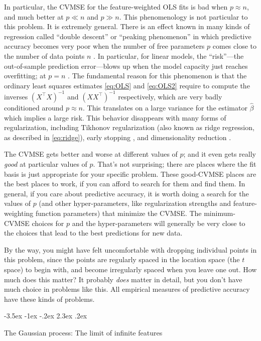 \documentclass[12pt,letterpaper]{article}
\makeatletter
\renewcommand\section{\@startsection {section}{1}{\z@}%
  {-3.5ex \@plus -1ex \@minus -.2ex}%
  {2.3ex \@plus.2ex}%
  {\raggedright\normalfont\Large\bfseries}}
\makeatother
\begin{document}
In particular, the CVMSE for the feature-weighted OLS fits is bad when $p\approx n$, and much better at $p\ll n$ and $p \gg n$.
This phenomenology is not particular to this problem.
It is extremely general.
There is an effect known in many kinds of regression called ``double descent'' or ``peaking phenomenon'' in which predictive accuracy becomes very poor when the number of free parameters $p$ comes close to the number of data points $n$ \cite{jain198239, spigler2018jamming, geiger2019jamming}. In particular, for linear models, the ``risk''---the out-of-sample prediction error---blows up when the model capacity just reaches overfitting; at $p=n$ \cite{hastie2019surprises}.
The fundamental reason for this phenomenon is that the ordinary least squares estimates \eqref{eq:OLS} and \eqref{eq:OLS2} require to compute the inverses $(X^\top X)^{-1}$ and $(XX^\top)^{-1}$ respectively, which are very badly conditioned around $p\approx n$. This translates on a large variance for the estimator $\hat \beta$ which implies a large risk. This behavior disappears with many forms of regularization, including Tikhonov regularization (also known as ridge regression, as described in \eqref{eq:ridge}), early stopping \citep{hastie2019surprises}, and dimensionality reduction \citep{huang2020dimensionality}.

The CVMSE gets better and worse at different values of $p$;
and it even gets really \emph{good} at particular values of $p$.
That's not surprising; there are places where the fit basis is just appropriate for your specific problem.
These good-CVMSE places are the best places to work, if you can afford to search for them and find them.
In general, if you care about predictive accuracy, it is worth doing a search for the values of $p$ (and other hyper-parameters, like regularization strengths and feature-weighting function parameters) that minimize the CVMSE.
The minimum-CVMSE choices for $p$ and the hyper-parameters will generally be very close to the choices that lead to the best predictions for new data.

By the way, you might have felt uncomfortable with dropping individual points in this problem, since the points are regularly spaced in the location space (the $t$ space) to begin with, and become irregularly spaced when you leave one out.
How much does this matter?
It probably \emph{does} matter in detail, but you don't have much choice in problems like this.
All empirical measures of predictive accuracy have these kinds of problems.

\section{The Gaussian process: The limit of infinite features}\label{sec:gp}
\end{document}
